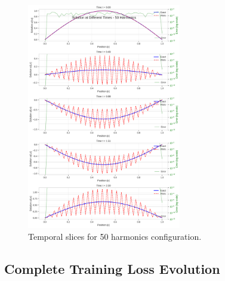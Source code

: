 \begin{figure}[H]
    \centering
    \includegraphics[width=0.6\textwidth]{figures/time_slices_50h.png}
    \caption{Temporal slices for 50 harmonics configuration.}
    \label{fig:time_slices_50h}
\end{figure}

\subsection{Complete Training Loss Evolution}

